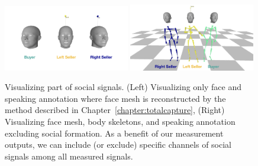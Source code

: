 \begin{figure}
	\centering
	\includegraphics[width=0.49\textwidth]{ssp_fig/haggling_ex_face}
	\includegraphics[width=0.49\textwidth]{ssp_fig/haggling_ex_facebody}
	\caption{Visualizing part of social signals. (Left) Visualizing only face and speaking annotation where face mesh is reconstructed by the method described in Chapter~\ref{chapter:totalcapture}, (Right) Visualizing face mesh, body skeletons, and speaking annotation excluding social formation. As a benefit of our measurement outputs, we can include (or exclude) specific channels of social signals among all measured signals.} 
	\label{fig:haggling_measurement_vis}
\end{figure}

